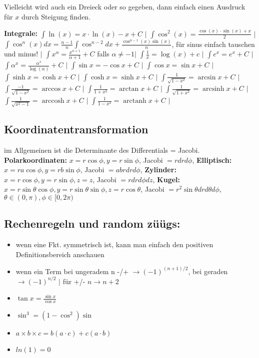 \documentclass[a3paper, ngerman, 8pt]{article}
\DeclareMathOperator{\arcsinh}{arcsinh}
\DeclareMathOperator{\arccosh}{arccosh}
\DeclareMathOperator{\arctanh}{arctanh}
\begin{document}
\begin{multicols*}{3}
Vielleicht wird auch ein Dreieck oder so gegeben, dann einfach einen Ausdruck für $x$ durch Steigung finden. 

\textbf{Integrale:} 
$\int \ln(x)=x\cdot \ln(x) - x + C$ $\big \vert$ 
$\int \cos^2(x)=\frac{\cos(x)\cdot \sin(x) + x}{2}$ $\big \vert$ 
$\int \cos^n(x)dx=\frac{n-1}{n}\int \cos^{n-2}dx+\frac{\cos^{n-1}(x)\sin(x)}{n}$,
für sinus einfach tauschen und minus! $\big \vert$
$\int x^{\alpha} = \frac{x^{\alpha + 1}}{\alpha + 1} + C$ falls $\alpha \neq -1 \big \vert$
$\int \frac{1}{x} = \log (x) + c$ $\big \vert$
$\int e^x = e^x + C$ $\big \vert$
$\int \alpha^{x} = \frac{\alpha^{x}}{\log (\alpha)} + C$ $\big \vert$
$\int \sin x = -\cos x + C$ $\big \vert$
$\int \cos x = \sin x + C$ $\big \vert$
$\int \sinh x = \cosh x + C$ $\big \vert$
$\int \cosh x = \sinh x + C$ $\big \vert$
$\int \frac{1}{\sqrt{1 - x^2}} = \arcsin x + C$ $\big \vert$ %
$\int \frac{-1}{\sqrt{1 - x^2}} = \arccos x + C$ $\big \vert$
$\int \frac{1}{1 + x^2} = \arctan x + C$ $\big \vert$
$\int \frac{1}{\sqrt{1 + x^2}} = \arcsinh x + C$ $\big \vert$
$\int \frac{1}{\sqrt{x^2 - 1}} = \arccosh x + C$ $\big \vert$
$\int \frac{1}{1 - x^2} = \arctanh x + C$ $\big \vert$


\subsection*{Koordinatentransformation}
im Allgemeinen ist die Determinante des Differentials = Jacobi. 
\textbf{Polarkoordinaten: } $x= r \cos\phi, y=r \sin\phi$, Jacobi $=rdrd\phi$, 
\textbf{Elliptisch:} $x=r a \cos\phi, y = r b \sin\phi$, Jacobi $=abrdrd\phi$,
\textbf{Zylinder:} $x=r \cos\phi, y=r \sin\phi, z=z$, Jacobi $=rdrd\phi dz$,
\textbf{Kugel:} $x=r \sin\theta \cos\phi, y=r \sin\theta \sin\phi, z=r \cos\theta$,
Jacobi $=r^2 \sin\theta drd\theta d\phi$, $\theta \in (0,\pi), \phi \in [0,2\pi)$

\subsection*{Rechenregeln und random züügs:} 
\begin{itemize}
	\item wenn eine Fkt. symmetrisch ist, kann man einfach den positiven Definitionsbereich anschauen
	\item wenn ein Term bei ungeradem n -/+ $\to (-1)^{(n+1)/2}$, bei geraden $\to (-1)^{n/2}$ $ \big \vert$ für +/- $n \to n+2$
	\item $\tan x = \frac{\sin x}{\cos x}$
	\item $\sin^3=(1-\cos^2)\sin$
	\item $a \times b \times c = b(a \cdot c) + c(a \cdot b)$
	\item $ln(1)=0$
\end{itemize}


\end{multicols*}
\end{document}
